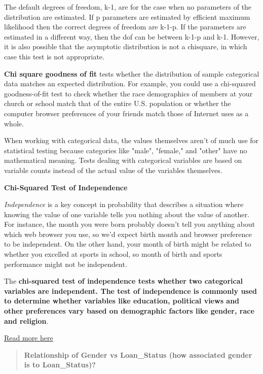 \documentclass[11pt]{article}
\begin{document}
The default degrees of freedom, k-1, are for the case when no parameters
of the distribution are estimated. If p parameters are estimated by
efficient maximum likelihood then the correct degrees of freedom are
k-1-p. If the parameters are estimated in a different way, then the dof
can be between k-1-p and k-1. However, it is also possible that the
asymptotic distribution is not a chisquare, in which case this test is
not appropriate.

\textbf{Chi square goodness of fit} tests whether the distribution of
sample categorical data matches an expected distribution. For example,
you could use a chi-squared goodness-of-fit test to check whether the
race demographics of members at your church or school match that of the
entire U.S. population or whether the computer browser preferences of
your friends match those of Internet uses as a whole.

When working with categorical data, the values themselves aren't of much
use for statistical testing because categories like "male", "female,"
and "other" have no mathematical meaning. Tests dealing with categorical
variables are based on variable counts instead of the actual value of
the variables themselves.

\textbf{Chi-Squared Test of Independence}

\emph{Independence} is a key concept in probability that describes a
situation where knowing the value of one variable tells you nothing
about the value of another. For instance, the month you were born
probably doesn't tell you anything about which web browser you use, so
we'd expect birth month and browser preference to be independent. On the
other hand, your month of birth might be related to whether you excelled
at sports in school, so month of birth and sports performance might not
be independent.

The \textbf{chi-squared test of independence tests whether two
categorical variables are independent. The test of independence is
commonly used to determine whether variables like education, political
views and other preferences vary based on demographic factors like
gender, race and religion}.

\href{http://hamelg.blogspot.com/2015/11/python-for-data-analysis-part-25-chi.html}{Read
more here}

    \begin{quote}
\textbf{Relationship of Gender vs Loan\_Status (how associated gender is
to Loan\_Status)?}
\end{quote}
\end{document}
